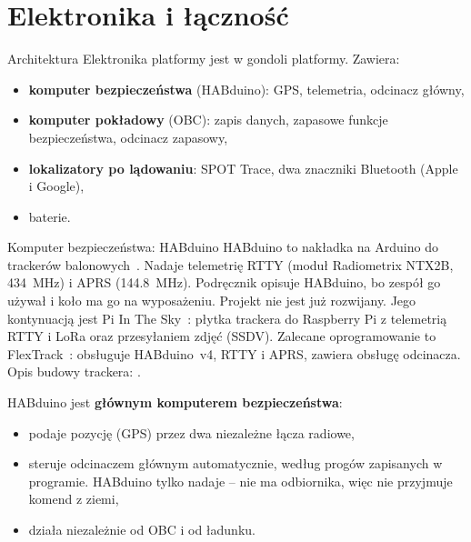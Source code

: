 \chapter{Elektronika i łączność}\label{ch:elektronika}

\begin{sekcja}{Architektura}
Elektronika platformy jest w gondoli platformy. Zawiera:
\begin{itemize}
  \item \textbf{komputer bezpieczeństwa} (HABduino): GPS, telemetria, odcinacz główny,
  \item \textbf{komputer pokładowy} (OBC): zapis danych, zapasowe funkcje bezpieczeństwa, odcinacz zapasowy,
  \item \textbf{lokalizatory po lądowaniu}: SPOT Trace, dwa znaczniki Bluetooth (Apple i Google),
  \item baterie.
\end{itemize}

\begin{center}\resizebox{\linewidth}{!}{\rysTorRadiowy}\end{center}
\label{fig:tor-radiowy}
\end{sekcja}

\begin{sekcja}{Komputer bezpieczeństwa: HABduino}
HABduino to nakładka na Arduino do trackerów balonowych~\cite{habduino}. Nadaje telemetrię RTTY (moduł Radiometrix NTX2B, \SI{434}{MHz}) i APRS (\SI{144.8}{MHz}). Podręcznik opisuje HABduino, bo zespół go używał i koło ma go na wyposażeniu. Projekt nie jest już rozwijany. Jego kontynuacją jest Pi In The Sky~\cite{pits}: płytka trackera do Raspberry Pi z telemetrią RTTY i LoRa oraz przesyłaniem zdjęć (SSDV). Zalecane oprogramowanie to FlexTrack~\cite{flextrack}: obsługuje HABduino~v4, RTTY i APRS, zawiera obsługę odcinacza. Opis budowy trackera: \cite{akerman}.

HABduino jest \textbf{głównym komputerem bezpieczeństwa}:
\begin{itemize}
  \item podaje pozycję (GPS) przez dwa niezależne łącza radiowe,
  \item steruje odcinaczem głównym automatycznie, według progów zapisanych w programie. HABduino tylko nadaje -- nie ma odbiornika, więc nie przyjmuje komend z ziemi,
  \item działa niezależnie od OBC i od ładunku.
\end{itemize}

\end{sekcja}

